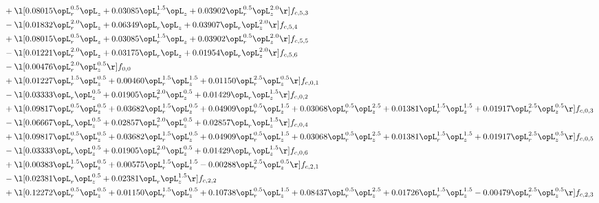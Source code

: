 \begin{alignat}{2}
& + \l[  0.08015 \opL_r^{0.5} \opL_z +  0.03085 \opL_r^{1.5} \opL_z +  0.03902 \opL_r^{0.5} \opL_z^{2.0}  \r] f_{c,5,3} \nonumber \\ 
& - \l[  0.01832 \opL_r^{2.0} \opL_z +  0.06349 \opL_r \opL_z +  0.03907 \opL_r \opL_z^{2.0}  \r] f_{c,5,4} \nonumber \\ 
& + \l[  0.08015 \opL_r^{0.5} \opL_z +  0.03085 \opL_r^{1.5} \opL_z +  0.03902 \opL_r^{0.5} \opL_z^{2.0}  \r] f_{c,5,5} \nonumber \\ 
& - \l[  0.01221 \opL_r^{2.0} \opL_z +  0.03175 \opL_r \opL_z +  0.01954 \opL_r \opL_z^{2.0}  \r] f_{c,5,6} \nonumber \\ 
& - \l[  0.00476 \opL_r^{2.0} \opL_z^{0.5}  \r] f_{0,0} \nonumber \\ 
& + \l[  0.01227 \opL_r^{1.5} \opL_z^{0.5} +  0.00460 \opL_r^{1.5} \opL_z^{1.5} +  0.01150 \opL_r^{2.5} \opL_z^{0.5}  \r] f_{c,0,1} \nonumber \\ 
& - \l[  0.03333 \opL_r \opL_z^{0.5} +  0.01905 \opL_r^{2.0} \opL_z^{0.5} +  0.01429 \opL_r \opL_z^{1.5}  \r] f_{c,0,2} \nonumber \\ 
& + \l[  0.09817 \opL_r^{0.5} \opL_z^{0.5} +  0.03682 \opL_r^{1.5} \opL_z^{0.5} +  0.04909 \opL_r^{0.5} \opL_z^{1.5} +  0.03068 \opL_r^{0.5} \opL_z^{2.5} +  0.01381 \opL_r^{1.5} \opL_z^{1.5} +  0.01917 \opL_r^{2.5} \opL_z^{0.5}  \r] f_{c,0,3} \nonumber \\ 
& - \l[  0.06667 \opL_r \opL_z^{0.5} +  0.02857 \opL_r^{2.0} \opL_z^{0.5} +  0.02857 \opL_r \opL_z^{1.5}  \r] f_{c,0,4} \nonumber \\ 
& + \l[  0.09817 \opL_r^{0.5} \opL_z^{0.5} +  0.03682 \opL_r^{1.5} \opL_z^{0.5} +  0.04909 \opL_r^{0.5} \opL_z^{1.5} +  0.03068 \opL_r^{0.5} \opL_z^{2.5} +  0.01381 \opL_r^{1.5} \opL_z^{1.5} +  0.01917 \opL_r^{2.5} \opL_z^{0.5}  \r] f_{c,0,5} \nonumber \\ 
& - \l[  0.03333 \opL_r \opL_z^{0.5} +  0.01905 \opL_r^{2.0} \opL_z^{0.5} +  0.01429 \opL_r \opL_z^{1.5}  \r] f_{c,0,6} \nonumber \\ 
& + \l[  0.00383 \opL_r^{1.5} \opL_z^{0.5} +  0.00575 \opL_r^{1.5} \opL_z^{1.5}   -0.00288 \opL_r^{2.5} \opL_z^{0.5}  \r] f_{c,2,1} \nonumber \\ 
& - \l[  0.02381 \opL_r \opL_z^{0.5} +  0.02381 \opL_r \opL_z^{1.5}  \r] f_{c,2,2} \nonumber \\ 
& + \l[  0.12272 \opL_r^{0.5} \opL_z^{0.5} +  0.01150 \opL_r^{1.5} \opL_z^{0.5} +  0.10738 \opL_r^{0.5} \opL_z^{1.5} +  0.08437 \opL_r^{0.5} \opL_z^{2.5} +  0.01726 \opL_r^{1.5} \opL_z^{1.5}   -0.00479 \opL_r^{2.5} \opL_z^{0.5}  \r] f_{c,2,3} \nonumber \\ 

\end{alignat}

